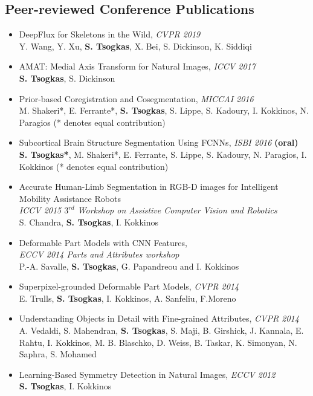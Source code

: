\documentclass[margin]{res}
\begin{document}
\begin{resume}
\section{Peer-reviewed Conference Publications} 
	\begin{itemize}
		\item DeepFlux for Skeletons in the Wild, \emph{CVPR 2019}\\
			Y. Wang, Y. Xu, \textbf{S. Tsogkas}, X. Bei, S. Dickinson, K. Siddiqi 
		\item AMAT: Medial Axis Transform for Natural Images, \emph{ICCV 2017}\\
			\textbf{S. Tsogkas}, S. Dickinson 
		\item  Prior-based Coregistration and Cosegmentation, \emph{MICCAI 2016}\\
			M. Shakeri*, E. Ferrante*, \textbf{S. Tsogkas}, S. Lippe, S. Kadoury, I. Kokkinos,  N. Paragios (* denotes equal contribution)   
		\item  Subcortical Brain Structure Segmentation Using FCNNs, \emph{ISBI 2016} \textbf{(oral)}\\
			\textbf{S. Tsogkas*}, M. Shakeri*, E. Ferrante, S. Lippe, S. Kadoury, N. Paragios, I. Kokkinos (* denotes equal contribution)   
		\item   Accurate Human-Limb Segmentation in RGB-D images for Intelligent Mobility Assistance Robots\\
			\emph{ICCV 2015 $3^{rd}$ Workshop on Assistive Computer Vision and Robotics}\\
			S. Chandra, \textbf{S. Tsogkas}, I. Kokkinos
		\item  Deformable Part Models with CNN Features,\\ \emph{ECCV 2014 Parts and Attributes workshop}\\
		P.-A. Savalle, \textbf{S. Tsogkas}, G. Papandreou and I. Kokkinos 
		\item  Superpixel-grounded Deformable Part Models, \emph{CVPR 2014}\\
			E. Trulls, \textbf{S. Tsogkas}, I. Kokkinos, A. Sanfeliu, F.Moreno
		\item Understanding Objects in Detail with Fine-grained Attributes, \emph{CVPR 2014} \\
		A. Vedaldi, S. Mahendran, \textbf{S. Tsogkas}, S. Maji, B. Girshick, J. Kannala, E. Rahtu, I. Kokkinos, M. B. Blaschko, D. Weiss, B. Taskar, K. Simonyan, N. Saphra, S. Mohamed 
		\item Learning-Based Symmetry Detection in Natural Images, \emph{ECCV 2012} \\
			\textbf{S. Tsogkas}, I. Kokkinos
	\end{itemize}


\end{resume}
\end{document}
